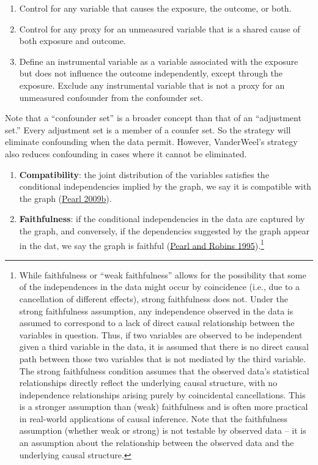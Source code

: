 \documentclass[
  singlecolumn]{article}
\providecommand{\tightlist}{%
  \setlength{\itemsep}{0pt}\setlength{\parskip}{0pt}}\usepackage{longtable,booktabs,array}
\begin{document}
\begin{enumerate}
\def\labelenumi{\alph{enumi}.}
\tightlist
\item
  Control for any variable that causes the exposure, the outcome, or
  both.
\item
  Control for any proxy for an unmeasured variable that is a shared
  cause of both exposure and outcome.
\item
  Define an instrumental variable as a variable associated with the
  exposure but does not influence the outcome independently, except
  through the exposure. Exclude any instrumental variable that is not a
  proxy for an unmeasured confounder from the confounder set.
\end{enumerate}

Note that a ``confounder set'' is a broader concept than that of an
``adjustment set.'' Every adjustment set is a member of a counfer set.
So the strategy will eliminate confounding when the data permit.
However, VanderWeel's strategy also reduces confounding in cases where
it cannot be eliminated.

\begin{enumerate}
\def\labelenumi{\arabic{enumi}.}
\setcounter{enumi}{7}
\item
  \textbf{Compatibility}: the joint distribution of the variables
  satisfies the conditional independencies implied by the graph, we say
  it is compatible with the graph
  (\protect\hyperlink{ref-pearl2009a}{Pearl 2009b}).
\item
  \textbf{Faithfulness}: if the conditional independencies in the data
  are captured by the graph, and conversely, if the dependencies
  suggested by the graph appear in the dat, we say the graph is faithful
  (\protect\hyperlink{ref-pearl1995a}{Pearl and Robins
  1995}).\footnote{While faithfulness or ``weak faithfulness'' allows
    for the possibility that some of the independences in the data might
    occur by coincidence (i.e., due to a cancellation of different
    effects), strong faithfulness does not. Under the strong
    faithfulness assumption, any independence observed in the data is
    assumed to correspond to a lack of direct causal relationship
    between the variables in question. Thus, if two variables are
    observed to be independent given a third variable in the data, it is
    assumed that there is no direct causal path between those two
    variables that is not mediated by the third variable. The strong
    faithfulness condition assumes that the observed data's statistical
    relationships directly reflect the underlying causal structure, with
    no independence relationships arising purely by coincidental
    cancellations. This is a stronger assumption than (weak)
    faithfulness and is often more practical in real-world applications
    of causal inference. Note that the faithfulness assumption (whether
    weak or strong) is not testable by observed data -- it is an
    assumption about the relationship between the observed data and the
    underlying causal structure.}
\end{enumerate}
\end{document}
